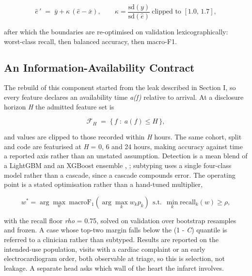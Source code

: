 \documentclass[conference,a4paper]{IEEEtran}
\begin{document}
\begin{equation}
\hat{e}\,' \;=\; \bar{y} + \kappa\,(\hat{e}-\bar{x}),\qquad \kappa = \frac{\mathrm{sd}(y)}{\mathrm{sd}(\hat{e})}\ \text{clipped to } [1.0,\,1.7],
\end{equation}

after which the boundaries are re-optimised on validation lexicographically: worst-class recall, then balanced accuracy, then macro-F1.

\subsection{An Information-Availability Contract}
The rebuild of this component started from the leak described in Section I, so every feature declares an availability time \textit{a(f)} relative to arrival. At a disclosure horizon \textit{H} the admitted feature set is

\begin{equation}
\mathcal{F}_H \;=\; \{\, f \;:\; a(f) \le H \,\},
\end{equation}

and values are clipped to those recorded within \textit{H} hours. The same cohort, split and code are featurised at \textit{H} = 0, 6 and 24 hours, making accuracy against time a reported axis rather than an unstated assumption. Detection is a mean blend of a LightGBM and an XGBoost ensemble \cite{ref10}, \cite{ref11}; subtyping uses a single four-class model rather than a cascade, since a cascade compounds error. The operating point is a stated optimisation rather than a hand-tuned multiplier,

\begin{equation}
w^{*} = \arg\max_{w}\ \mathrm{macroF_1}\!\left(\arg\max_k w_k p_k\right)\ \ \text{s.t.}\ \ \min_k \mathrm{recall}_k(w) \ge \rho,
\end{equation}

with the recall floor \textit{rho} = 0.75, solved on validation over bootstrap resamples and frozen. A case whose top-two margin falls below the (1 - \textit{C}) quantile is referred to a clinician rather than subtyped. Results are reported on the intended-use population, visits with a cardiac complaint or an early electrocardiogram order, both observable at triage, so this is selection, not leakage. A separate head asks which wall of the heart the infarct involves.
\end{document}
